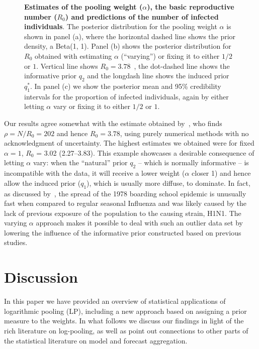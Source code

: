 \documentclass[12pt]{article}
\begin{document}
\begin{figure}[!ht]
\begin{center}
\end{center}
\caption{\textbf{Estimates of the pooling weight ($\alpha$), the basic reproductive number ($R_0$) and predictions of the number of infected individuals}.
The posterior distribution for the pooling weight $\alpha$ is shown in panel (a), where the horizontal dashed line shows the prior density, a Beta(1, 1).
Panel (b) shows the posterior distribution for $R_0$ obtained with estimating $\alpha$ (``varying'') or fixing it to either $1/2$ or $1$.
Vertical line shows $R_0 = 3.78$~\parencite{Murray2002}, the dot-dashed line shows the informative prior $q_2$ and the longdash line shows the induced prior $q_1^\ast$.
In panel (c) we show the posterior mean and 95\% credibility intervals for the proportion of infected individuals, again by either letting $\alpha$ vary or fixing it to either $1/2$ or $1$.
}
\label{fig:SIR_results}
\end{figure}

Our results agree somewhat with the estimate obtained by~\textcite{Murray2002}, who finds $\rho = N/R_0 = 202$ and hence $R_0 = 3.78$, using purely numerical methods with no acknowledgment of uncertainty.
The highest estimates we obtained were for fixed $\alpha = 1$, $R_0$ = 3.02 (2.27--3.83).
This example showcases a desirable consequence of letting $\alpha$ vary: when the ``natural'' prior $q_2$ -- which is normally informative -- is incompatible with the data, it will receive a lower weight ($\alpha$ closer 1) and hence allow the induced prior ($q_1$), which is usually more diffuse, to dominate.
In fact, as discussed by~\textcite{Biggerstaff2014}, the spread of the 1978 boarding school epidemic is unusually fast when compared to regular seasonal Influenza and was likely caused by the lack of previous exposure of the population to the causing strain, H1N1.
The varying $\alpha$ approach makes it possible to deal with such an outlier data set by lowering the influence of the informative prior constructed based on previous studies.

\section{Discussion}
\label{sec:discussion}

In this paper we have provided an overview of statistical applications of logarithmic pooling (LP), including a new approach based on assigning a prior measure to the weights.
In what follows we discuss our findings in light of the rich literature on log-pooling, as well as point out connections to other parts of the statistical literature on model and forecast aggregation.
\end{document}
